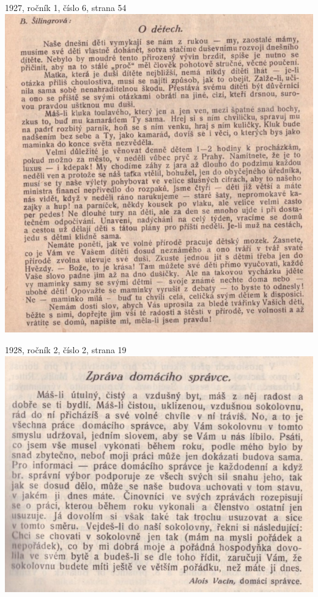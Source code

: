 \documentclass[11pt]{article}
\begin{document}
\vspace{\baselineskip}

1927, ročník 1, číslo 6, strana 54 \\
\includegraphics[width=\imagewidth]{original/1927/Skener_20250316 (6).jpg}





1928, ročník 2, číslo 2, strana 19 \\
\includegraphics[width=\imagewidth]{original/1928/Skener_20250320.jpg}
\end{document}
